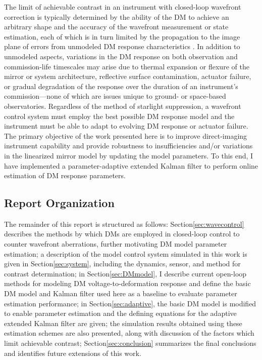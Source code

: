 \documentclass[11pt,reqno]{amsart}
\begin{document}
The limit of achievable contrast in an instrument with closed-loop wavefront correction is typically determined by the ability of the DM to achieve an arbitrary shape and the accuracy of the wavefront measurement or state estimation, each of which is in turn limited by the propagation to the image plane of errors from unmodeled DM response characteristics \cite{Tyson2011}.  In addition to unmodeled aspects, variations in the DM response on both observation and commission-life timescales may arise due to thermal expansion or flexure of the mirror or system architecture, reflective surface contamination, actuator failure, or gradual degradation of the response over the duration of an instrument's commission---none of which are issues unique to ground- or space-based observatories.  Regardless of the method of starlight suppression, a wavefront control system must employ the best possible DM response model and the instrument must be able to adapt to evolving DM response or actuator failure.  The primary objective of the work presented here is to improve direct-imaging instrument capability and provide robustness to insufficiencies and/or variations in the linearized mirror model by updating the model parameters.  To this end, I have implemented a parameter-adaptive extended Kalman filter to perform online estimation of DM response parameters.

\subsection{Report Organization}

The remainder of this report is structured as follows: Section\:\ref{sec:wavecontrol} describes the methods by which DMs are employed in closed-loop control to counter wavefront aberrations, further motivating DM model parameter estimation;  a description of the model control system simulated in this work is given in Section\:\ref{sec:system}, including the dynamics, sensor, and method for contrast determination; in Section\:\ref{sec:DMmodel}, I describe current open-loop methods for modeling DM voltage-to-deformation response and define the basic DM model and Kalman filter used here as a baseline to evaluate parameter estimation performance; in Section\:\ref{sec:adaptive}, the basic DM model is modified to enable parameter estimation and the defining equations for the adaptive extended Kalman filter are given; the simulation results obtained using these estimation schemes are also presented, along with discussion of the factors which limit achievable contrast; Section\:\ref{sec:conclusion} summarizes the final conclusions and identifies future extensions of this work.
\end{document}
